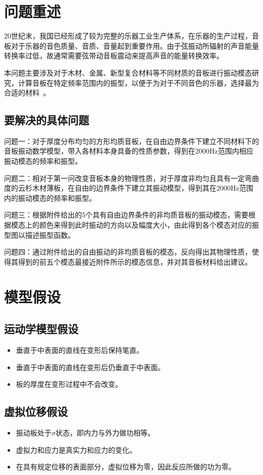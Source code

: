 \documentclass[withoutpreface,bwprint]{cumcmthesis} %
\begin{document}

\section{问题重述}
20世纪末，我国已经形成了较为完整的乐器工业生产体系，在乐器的生产过程，音板对于乐器的音色质量、音质、音量起到重要作用。由于弦振动所辐射的声音能量转换率过低，故通常需要弦带动音板震动来提高声音的能量转换效率。

本问题主要涉及对于木材、金属、新型复合材料等不同材质的音板进行振动模态研究，计算音板在特定频率范围内的振型，以便于为对于不同音色的乐器，选择最为合适的材料~\cite{ref1}。
\subsection{要解决的具体问题}
问题一：对于厚度分布均匀的方形均质音板，在自由边界条件下建立不同材料下的音板振动数学模型，带入各材料本身具备的性质参数，得到在2000Hz范围内相应振动模态的频率和振型。

问题二：相对于第一问改变音板本身的物理性质，对于厚度非均匀且具有一定弯曲度的云杉木材薄板，在自由的边界条件下建立其振动模型，得到其在2000Hz范围内的振动模态的频率和振型。

问题三：根据附件给出的5个具有自由边界条件的非均质音板的振动模态，需要根据模态上的颜色来得到此时振动的方向以及幅度大小，由此得到各个模态对应的振型图以描述振型函数。

问题四：通过附件给出的自由振动的非均质音板的模态，反向得出其物理性质，使得其得到的前五个模态最接近附件所示的模态信息，并对其音板材料给出建议。
\section{模型假设}
\subsection{运动学模型假设}
\begin{itemize}
	\item 垂直于中表面的直线在变形后保持笔直。
	\item 垂直于中表面的直线在变形后仍垂直于中表面。
	\item 板的厚度在变形过程中不会改变。
\end{itemize}
\subsection{虚拟位移假设}
\begin{itemize}
        \item 振动板处于$\sigma$状态，即内力与外力做功相等。
	\item 虚拟力和应力是真实力和应力的变化。
	\item 在具有规定位移的表面部分，虚拟位移为零，因此反应所做的功为零。
\end{itemize}
\end{document}
